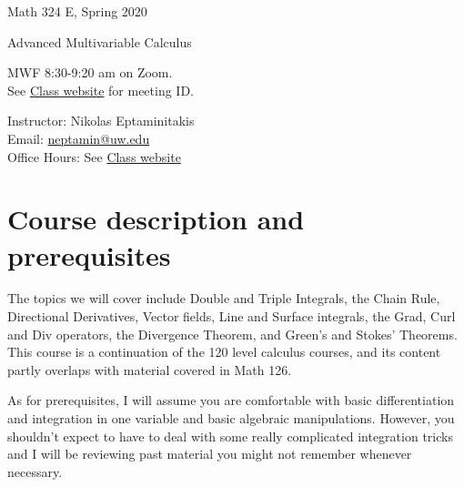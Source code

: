 \documentclass[11pt]{article}
\begin{document}
 \noindent\LARGE Math 324 E, Spring 2020 

 \medskip

 \noindent\LARGE Advanced Multivariable Calculus \\

 \medskip

 \noindent\large MWF 8:30-9:20 am	on Zoom. \\
 See \href{https://sites.math.washington.edu/~neptamin/324Sp20/Math%20324%20E%20Spring%202020.html}{Class website} for meeting ID.\\

\vspace{2mm}


\noindent\large Instructor: Nikolas Eptaminitakis\\
\noindent\large Email: \href{mailto:neptamin@uw.edu}{neptamin@uw.edu} \\
\noindent\large Office Hours: See \href{https://sites.math.washington.edu/~neptamin/324Sp20/Math%20324%20E%20Spring%202020.html}{Class website}


\section*{Course description and prerequisites}
 The topics we will cover include Double and Triple Integrals, the Chain Rule, Directional Derivatives, Vector fields, Line and Surface integrals, the Grad, Curl and Div operators, the Divergence Theorem, and Green's and Stokes' Theorems. This course is a continuation of the 120 level calculus courses, and its content partly overlaps with material covered in Math 126. 

As for prerequisites, I will assume you are comfortable with basic differentiation and integration in one variable and basic algebraic manipulations. However, you shouldn't expect to have to deal with some really complicated integration tricks and I will be reviewing past material you might not remember whenever necessary.
\end{document}
